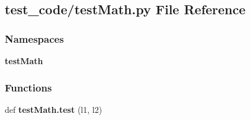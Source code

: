 \subsection{test\+\_\+code/test\+Math.py File Reference}
\label{test__code_2test_math_8py}
\subsubsection*{Namespaces}
\begin{DoxyCompactItemize}
\item 
 \textbf{ test\+Math}
\end{DoxyCompactItemize}
\subsubsection*{Functions}
\begin{DoxyCompactItemize}
\item 
def \textbf{ test\+Math.\+test} (l1, l2)
\end{DoxyCompactItemize}

